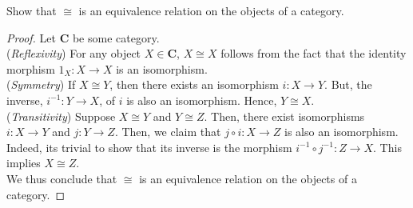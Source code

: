 \documentclass[]{amsbook}
\newcommand{\catname}[1]{\mathbf{#1}}
\begin{document}
\begin{Exercise}
	Show that $\cong$ is an equivalence relation on the objects of a category.
\end{Exercise}
\begin{proof}
	Let $\catname{C}$ be some category.\\
	(\emph{Reflexivity}) For any object $X \in \catname{C}$, $X \cong X$
	follows from the fact that the identity morphism $1_X: X \to X$ is an
	isomorphism.\\
	(\emph{Symmetry}) If $X \cong Y$, then there exists an isomorphism $i: X
	\to Y$. But, the inverse, $i^{-1}: Y \to X$, of $i$ is also an isomorphism.
	Hence, $Y \cong X$.\\
	(\emph{Transitivity}) Suppose $X \cong Y$ and $Y \cong Z$. Then, there
	exist isomorphisms $i: X \to Y$ and $j: Y \to Z$. Then, we claim that
	$j \circ i: X \to Z$ is also an isomorphism. Indeed, its trivial to show
	that its inverse is the morphism $i^{-1} \circ j^{-1}: Z \to X$. This
	implies $X \cong Z$.\\
	We thus conclude that $\cong$ is an equivalence relation on the objects of
	a category.
\end{proof}
\end{document}
